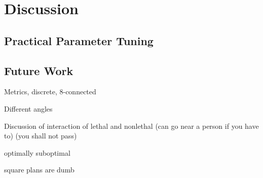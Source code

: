 \section{Discussion}
\subsection{Practical Parameter Tuning}
\subsection{Future Work}
Metrics, discrete, 8-connected

Different angles

Discussion of interaction of lethal and nonlethal (can go near a person if you have to) (you shall not pass)

optimally suboptimal

square plans are dumb
